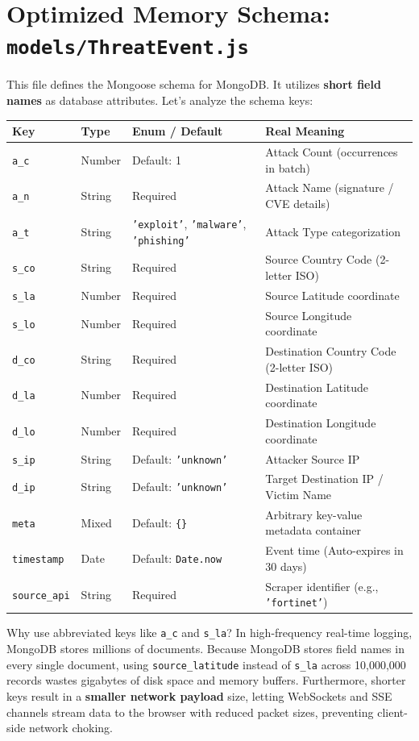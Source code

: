 \documentclass[11pt,a4paper]{report}
\begin{document}
\section{Optimized Memory Schema: \texttt{models/ThreatEvent.js}}
This file defines the Mongoose schema for MongoDB. It utilizes \textbf{short field names} as database attributes. Let's analyze the schema keys:
\begin{longtable}{lllp{6.5cm}}
\toprule
\textbf{Key} & \textbf{Type} & \textbf{Enum / Default} & \textbf{Real Meaning} \\
\midrule
\texttt{a\_c} & Number & Default: 1 & Attack Count (occurrences in batch) \\
\texttt{a\_n} & String & Required & Attack Name (signature / CVE details) \\
\texttt{a\_t} & String & \texttt{'exploit'}, \texttt{'malware'}, \texttt{'phishing'} & Attack Type categorization \\
\texttt{s\_co} & String & Required & Source Country Code (2-letter ISO) \\
\texttt{s\_la} & Number & Required & Source Latitude coordinate \\
\texttt{s\_lo} & Number & Required & Source Longitude coordinate \\
\texttt{d\_co} & String & Required & Destination Country Code (2-letter ISO) \\
\texttt{d\_la} & Number & Required & Destination Latitude coordinate \\
\texttt{d\_lo} & Number & Required & Destination Longitude coordinate \\
\texttt{s\_ip} & String & Default: \texttt{'unknown'} & Attacker Source IP \\
\texttt{d\_ip} & String & Default: \texttt{'unknown'} & Target Destination IP / Victim Name \\
\texttt{meta} & Mixed & Default: \texttt{\{\}} & Arbitrary key-value metadata container \\
\texttt{timestamp} & Date & Default: \texttt{Date.now} & Event time (Auto-expires in 30 days) \\
\texttt{source\_api} & String & Required & Scraper identifier (e.g., \texttt{'fortinet'}) \\
\bottomrule
\end{longtable}

\begin{deepdive}{Why use abbreviated keys like \texttt{a\_c} and \texttt{s\_la}?}
  In high-frequency real-time logging, MongoDB stores millions of documents. Because MongoDB stores field names in every single document, using \texttt{source\_latitude} instead of \texttt{s\_la} across 10,000,000 records wastes gigabytes of disk space and memory buffers. Furthermore, shorter keys result in a \textbf{smaller network payload} size, letting WebSockets and SSE channels stream data to the browser with reduced packet sizes, preventing client-side network choking.
\end{deepdive}
\end{document}
